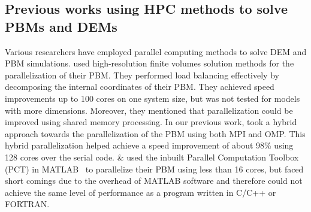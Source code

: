 \documentclass[preprint,11pt,authoryear]{elsarticle}
\newcommand{\gpnote}[1]{{\textcolor{green} {***giannis: #1}}}
\newcommand{\gpnote}[1]{}
\begin{document}

\subsection{Previous works using HPC methods to solve PBMs and DEMs}
Various researchers have employed parallel computing methods to solve DEM and PBM simulations. 
\cite{Gunawan2008} used high-resolution finite volumes solution methods for the parallelization 
of their PBM. They performed load 
balancing effectively by decomposing the internal coordinates of their PBM. They achieved 
speed improvements up to 100 cores on one system size, but was not tested for models 
with more dimensions. Moreover, they mentioned that parallelization could be 
improved using shared memory processing. 
In our previous work, \cite{Bettencourt2017} took a 
hybrid approach towards the parallelization of the PBM using both MPI and OMP. 
This hybrid parallelization helped achieve a speed improvement of about 98\% using 
128 cores over the serial code. \cite{Prakash2013a} \& \cite{Prakash2013b} used 
the inbuilt Parallel Computation Toolbox (PCT) in MATLAB~\citep{pctMatlab} to parallelize 
their PBM using less than 16 cores, but faced short comings due to the overhead 
of MATLAB software and therefore could not achieve the same level of performance 
as a program written in C/C++ or FORTRAN.  
\end{document}
